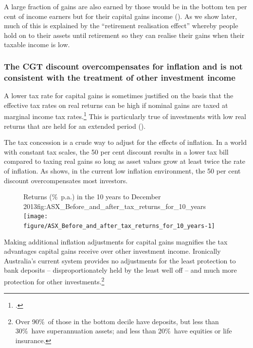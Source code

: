 \documentclass{grattan}\usepackage[]{graphicx}\usepackage[]{color}
\begin{document}
A large fraction of gains are also earned by those would be in the bottom ten per cent of income earners but for their capital gains income (). As we show later, much of this is explained by the ``retirement realisation effect'' whereby people hold on to their assets until retirement so they can realise their gains when their taxable income is low. 


\subsubsection{The CGT discount overcompensates for inflation and is not consistent with the treatment of other investment income}
A lower tax rate for capital gains is sometimes justified on the basis that the effective tax rates on real returns can be high if nominal gains are taxed at marginal income tax rates.\footcite{Treasury2010} This is particularly true of investments with low real returns that are held for an extended period ().

The tax concession is a crude way to adjust for the effects of inflation. In a world with constant tax scales, the 50 per cent discount results in a lower tax bill compared to taxing real gains so long as asset values grow at least twice the rate of inflation. As  shows, in the current low inflation environment, the 50 per cent discount overcompensates most investors.%


\begin{figure}
{Returns (\%\ p.a.) in the 10 years to December 2013}{fig:ASX_Before_and_after_tax_returns_for_10_years}
\texttt{[image: figure/ASX\_Before\_and\_after\_tax\_returns\_for\_10\_years-1]}
\end{figure}





Making additional inflation adjustments for capital gains magnifies the tax advantages capital gains receive over other investment income. Ironically Australia's current system provides no adjustments for the least protection to bank deposits -- disproportionately held by the least well off -- and much more protection for other investments.\footnote{Over 90\%\ of those in the bottom decile have deposits, but less than 30\%\ have superannuation assets; and less than 20\%\ have equities or life insurance.}
\end{document}
